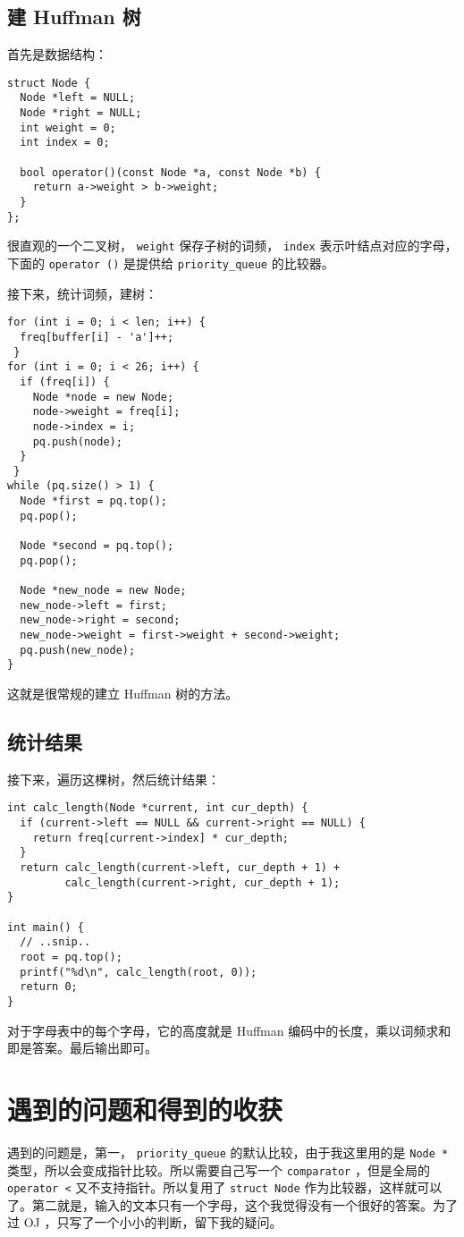 \documentclass[11pt]{article}
\begin{document}
\subsection{建 Huffman 树}
\label{sec:orgd210d60}
首先是数据结构：

\begin{verbatim}
struct Node {
  Node *left = NULL;
  Node *right = NULL;
  int weight = 0;
  int index = 0;

  bool operator()(const Node *a, const Node *b) {
    return a->weight > b->weight;
  }
};
\end{verbatim}

很直观的一个二叉树， \texttt{weight} 保存子树的词频， \texttt{index} 表示叶结点对应的字母，下面的 \texttt{operator ()} 是提供给 \texttt{priority\_queue} 的比较器。

接下来，统计词频，建树：

\begin{verbatim}
for (int i = 0; i < len; i++) {
  freq[buffer[i] - 'a']++;
 }
for (int i = 0; i < 26; i++) {
  if (freq[i]) {
    Node *node = new Node;
    node->weight = freq[i];
    node->index = i;
    pq.push(node);
  }
 }
while (pq.size() > 1) {
  Node *first = pq.top();
  pq.pop();

  Node *second = pq.top();
  pq.pop();

  Node *new_node = new Node;
  new_node->left = first;
  new_node->right = second;
  new_node->weight = first->weight + second->weight;
  pq.push(new_node);
}
\end{verbatim}

这就是很常规的建立 Huffman 树的方法。

\subsection{统计结果}
\label{sec:orgc5386b4}
接下来，遍历这棵树，然后统计结果：

\begin{verbatim}
int calc_length(Node *current, int cur_depth) {
  if (current->left == NULL && current->right == NULL) {
    return freq[current->index] * cur_depth;
  }
  return calc_length(current->left, cur_depth + 1) +
         calc_length(current->right, cur_depth + 1);
}

int main() {
  // ..snip..
  root = pq.top();
  printf("%d\n", calc_length(root, 0));
  return 0;
}
\end{verbatim}

对于字母表中的每个字母，它的高度就是 Huffman 编码中的长度，乘以词频求和即是答案。最后输出即可。

\section{遇到的问题和得到的收获}
\label{sec:org690e3f8}
遇到的问题是，第一， \texttt{priority\_queue} 的默认比较，由于我这里用的是 \texttt{Node *} 类型，所以会变成指针比较。所以需要自己写一个 \texttt{comparator} ，但是全局的 \texttt{operator <} 又不支持指针。所以复用了 \texttt{struct Node} 作为比较器，这样就可以了。第二就是，输入的文本只有一个字母，这个我觉得没有一个很好的答案。为了过 OJ ，只写了一个小小的判断，留下我的疑问。
\end{document}
